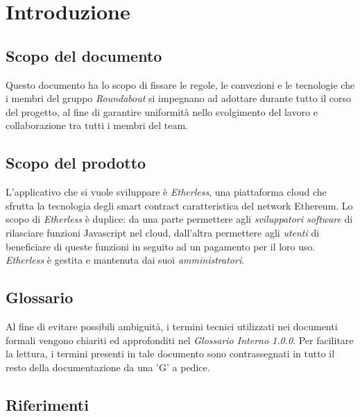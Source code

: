 \section{Introduzione}

\subsection{Scopo del documento}
Questo documento ha lo scopo di fissare le regole, le convezioni e le tecnologie che i membri del gruppo \textit{Roundabout} si impegnano ad adottare durante tutto il corso del progetto, al fine di garantire uniformità nello svolgimento del lavoro e collaborazione tra tutti i membri del team.

\subsection{Scopo del prodotto}
L'applicativo che si vuole sviluppare è \textit{Etherless}, una piattaforma cloud che sfrutta la tecnologia degli smart contract caratteristica del network Ethereum. Lo scopo di \textit{Etherless} è duplice: da una parte permettere agli \textit{sviluppatori software} di rilasciare funzioni Javascript nel cloud, dall'altra permettere agli \textit{utenti} di beneficiare di queste funzioni in seguito ad un pagamento per il loro uso. %
\textit{Etherless} è gestita e mantenuta dai suoi \textit{amministratori}.

\subsection{Glossario}
Al fine di evitare possibili ambiguità, i termini tecnici utilizzati nei documenti formali vengono chiariti ed approfonditi nel \textit{Glossario Interno 1.0.0}. Per facilitare la lettura, i termini presenti in tale documento sono contrassegnati in tutto il resto della documentazione da una 'G' a pedice.

\subsection{Riferimenti}

